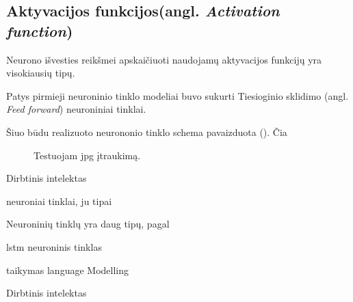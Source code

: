   \subsection{Aktyvacijos funkcijos(angl. \textit{Activation function})}
Neurono išvesties reikšmei apskaičiuoti naudojamų aktyvacijos funkcijų yra visokiausių tipų.




Patys pirmieji neuroninio tinklo modeliai buvo sukurti Tiesioginio sklidimo (angl. \textit{Feed forward}) neuroniniai tinklai.

\cite{Ieva2012}


Šiuo būdu realizuoto neurononio tinklo schema pavaizduota (). Čia




\begin{figure}
  \centering
{}
\caption{Testuojam jpg įtraukimą.}
\end{figure}



Dirbtinis intelektas


neuroniai tinklai, ju tipai


Neuroninių tinklų yra daug tipų, pagal



lstm neuroninis tinklas

taikymas language Modelling


Dirbtinis intelektas
